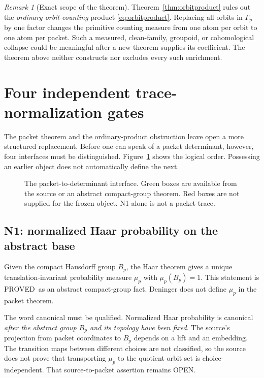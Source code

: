 \documentclass[11pt]{article}
\theoremstyle{definition}
\theoremstyle{remark}
\newtheorem{remark}[theorem]{Remark}
\newcommand{\proved}{\textsf{PROVED}}
\newcommand{\openclaim}{\textsf{OPEN}}
\begin{document}
\begin{remark}[Exact scope of the theorem]
Theorem~\ref{thm:orbitproduct} rules out the \emph{ordinary orbit-counting}
product \eqref{eq:orbitproduct}.  Replacing all orbits in \(\Gamma_p\) by one
factor changes the primitive counting measure from one atom per orbit to one
atom per packet.  Such a measured, clean-family, groupoid, or cohomological
collapse could be meaningful after a new theorem supplies its coefficient.
The theorem above neither constructs nor excludes every such enrichment.
\end{remark}

\section{Four independent trace-normalization gates}
\label{sec:gates}

The packet theorem and the ordinary-product obstruction leave open a more
structured replacement.  Before one can speak of a packet determinant,
however, four interfaces must be distinguished.  Figure~\ref{fig:gates}
shows the logical order.  Possessing an earlier object does not automatically
define the next.

\begin{figure}[ht]
\centering

\caption{The packet-to-determinant interface.  Green boxes are available from
the source or an abstract compact-group theorem.  Red boxes are not supplied
for the frozen object.  N1 alone is not a packet trace.}
\label{fig:gates}
\end{figure}

\subsection{N1: normalized Haar probability on the abstract base}

Given the compact Hausdorff group \(B_p\), the Haar theorem gives a unique
translation-invariant probability measure \(\mu_p\) with
\(\mu_p(B_p)=1\).  This statement is \proved\ as an abstract compact-group
fact.  Deninger does not define \(\mu_p\) in the packet theorem.

The word canonical must be qualified.  Normalized Haar probability is
canonical \emph{after the abstract group \(B_p\) and its topology have been
fixed}.  The source's projection from packet coordinates to \(B_p\) depends
on a lift and an embedding.  The transition maps between different choices
are not classified, so the source does not prove that transporting
\(\mu_p\) to the quotient orbit set is choice-independent.  That
source-to-packet assertion remains \openclaim.
\end{document}
